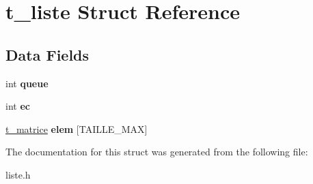 \hypertarget{structt__liste}{}\section{t\+\_\+liste Struct Reference}
\label{structt__liste}
\subsection*{Data Fields}
\begin{DoxyCompactItemize}
\item 
\mbox{\label{structt__liste_a404442353660d7effc914ba8220ebf7f}} 
int {\bfseries queue}
\item 
\mbox{\label{structt__liste_a59e5dec85b6fd6e9ce7498410e234982}} 
int {\bfseries ec}
\item 
\mbox{\label{structt__liste_a3cad0928b3a2acd391b940070b2080f0}} 
\mbox{\hyperlink{structt__matrice}{t\+\_\+matrice}} {\bfseries elem} \mbox{[}T\+A\+I\+L\+L\+E\+\_\+\+M\+AX\mbox{]}
\end{DoxyCompactItemize}


The documentation for this struct was generated from the following file\+:\begin{DoxyCompactItemize}
\item 
liste.\+h\end{DoxyCompactItemize}
